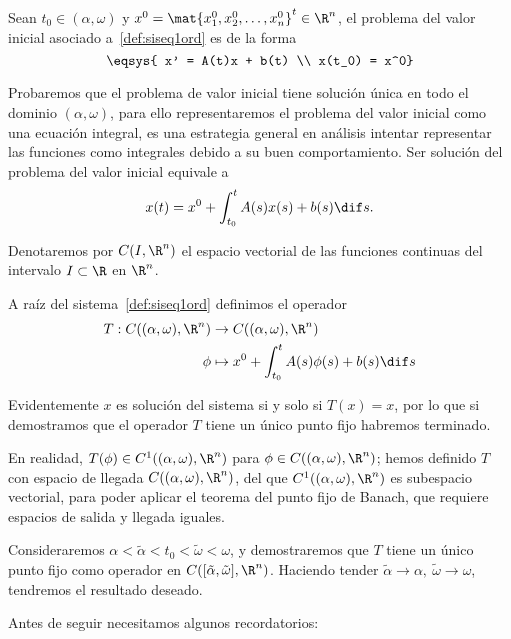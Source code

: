 \documentclass[../ecuaciones_diferenciales.tex]{subfiles}
\begin{document}
\begin{definition}
	Sean \(t_0 \in (\alpha, \omega)\) y
	\(x^0 = \mat{x^0_1, x^0_2, \dots, x^0_n}^t \in \R^n\), el problema del valor
	inicial asociado a~\ref{def:siseq1ord} es de la forma
	\[\eqsys{
			x' = A(t)x + b(t) \\
			x(t_0) = x^0}\]
\end{definition}

Probaremos que el problema de valor inicial tiene solución única en todo el
dominio \((\alpha, \omega)\), para ello representaremos el problema del valor
inicial como una ecuación integral, es una estrategia general en análisis
intentar representar las funciones como integrales debido a su buen
comportamiento. Ser solución del problema del valor inicial equivale a
\[x(t) = x^0 + \int_{t_0}^t A(s)x(s) + b(s) \dif s.\]

Denotaremos por \(C(I, \R^n)\) el espacio vectorial de las funciones continuas
del intervalo \(I \subset \R\) en \(\R^n\).

A raíz del sistema~\ref{def:siseq1ord} definimos el operador
\begin{align*}
	T : C((\alpha, \omega), \R^n) & \to C((\alpha, \omega), \R^n)                         \\
	\phi                          & \mapsto x^0 + \int_{t_0}^t A(s) \phi(s) + b(s) \dif s
\end{align*}

Evidentemente \(x\) es solución del sistema si y solo si \(T(x) = x\), por lo
que si demostramos que el operador \(T\) tiene un único punto fijo habremos
terminado.

\begin{remark}
	En realidad, \(T(\phi) \in C^1((\alpha, \omega), \R^n)\) para
	\(\phi \in C((\alpha, \omega), \R^n)\); hemos definido \(T\) con espacio de
	llegada \(C((\alpha, \omega), \R^n)\), del que \(C^1((\alpha, \omega), \R^n)\)
	es subespacio vectorial, para poder aplicar el teorema del punto fijo de
	Banach, que requiere espacios de salida y llegada iguales.
\end{remark}

Consideraremos \(\alpha < \tilde{\alpha} < t_0 < \tilde{\omega} < \omega\), y
demostraremos que \(T\) tiene un único punto fijo como operador en
\(C([\tilde{\alpha}, \tilde{\omega}], \R^n)\). Haciendo tender \(\tilde{\alpha}
\to \alpha,\ \tilde{\omega} \to \omega\), tendremos el resultado deseado.

Antes de seguir necesitamos algunos recordatorios:
\end{document}
